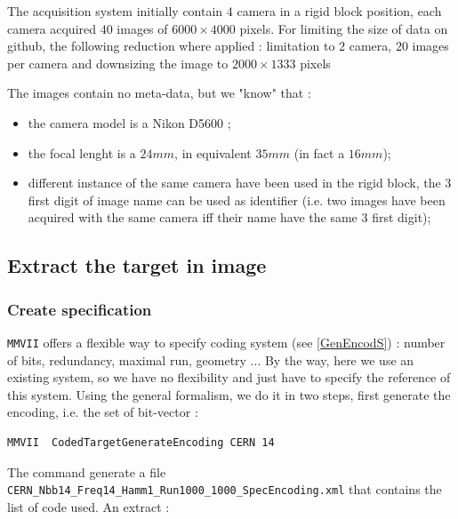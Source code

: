 The acquisition system initially contain $4$ camera in a rigid block position, each camera acquired
$40$ images of $6000 \times  4000$ pixels. For limiting the size of data on github, the following reduction
where applied : limitation to $2$ camera, $20$ images per camera and downsizing the image to $2000 \times  1333$ pixels

The images contain no meta-data, but we "know" that :

\begin{itemize}
     \item the camera model is a Nikon D5600 ;
     \item the focal lenght is a $24mm$, in equivalent $35mm$ (in fact a $16mm$);
     \item different instance of the same camera have been used in the rigid
           block, the $3$ first digit of image name can be used as identifier
           (i.e. two images have been acquired with the same camera iff their name have the
		same $3$ first digit);
\end{itemize}



\subsection{Extract the target in image}


\subsubsection{Create specification}

{\tt MMVII} offers a flexible way to specify coding system (see \ref{GenEncodS}) :
number of bits, redundancy,  maximal run, geometry ... By the way, here we use
an existing system, so we have no flexibility and just have to specify the reference 
of this system.  Using the general formalism, we do it in two steps, first generate
the encoding, i.e. the set of bit-vector :

\begin{lstlisting}
MMVII  CodedTargetGenerateEncoding CERN 14
\end{lstlisting}

The command generate a file {\tt CERN\_Nbb14\_Freq14\_Hamm1\_Run1000\_1000\_SpecEncoding.xml}
that contains the list of code used. An extract :

